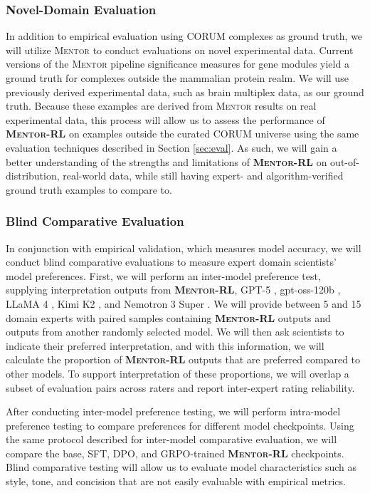 \documentclass[thesis,letterpaper,12pt]{utthesis}
\begin{document}
\subsubsection{Novel-Domain Evaluation}
In addition to empirical evaluation using CORUM complexes as ground truth, we will utilize \textsc{Mentor} to conduct evaluations on novel experimental data. Current versions of the \textsc{Mentor} pipeline significance measures for gene modules yield a ground truth for complexes outside the mammalian protein realm. We will use previously derived experimental data, such as brain multiplex data, as our ground truth. Because these examples are derived from \textsc{Mentor} results on real experimental data, this process will allow us to assess the performance of \textbf{\textsc{Mentor-RL}} on examples outside the curated CORUM universe using the same evaluation techniques described in Section \ref{sec:eval}. As such, we will gain a better understanding of the strengths and limitations of \textbf{\textsc{Mentor-RL}} on out-of-distribution, real-world data, while still having expert- and algorithm-verified ground truth examples to compare to.

\subsubsection{Blind Comparative Evaluation}\label{sec:blind-eval}
In conjunction with empirical validation, which measures model accuracy, we will conduct blind comparative evaluations to measure expert domain scientists' model preferences. First, we will perform an inter-model preference test, supplying interpretation outputs from \textbf{\textsc{Mentor-RL}}, GPT-5 \cite{gpt5}, gpt-oss-120b \cite{gpt-oss}, LLaMA 4 \cite{llama4}, Kimi K2 \cite{kimik2}, and Nemotron 3 Super \cite{nemotron3}. We will provide between 5 and 15 domain experts with paired samples containing \textbf{\textsc{Mentor-RL}} outputs and outputs from another randomly selected model. We will then ask scientists to indicate their preferred interpretation, and with this information, we will calculate the proportion of \textbf{\textsc{Mentor-RL}} outputs that are preferred compared to other models. To support interpretation of these proportions, we will overlap a subset of evaluation pairs across raters and report inter-expert rating reliability.

After conducting inter-model preference testing, we will perform intra-model preference testing to compare preferences for different model checkpoints. Using the same protocol described for inter-model comparative evaluation, we will compare the base, SFT, DPO, and GRPO-trained \textbf{\textsc{Mentor-RL}} checkpoints. Blind comparative testing will allow us to evaluate model characteristics such as style, tone, and concision that are not easily evaluable with empirical metrics.
\end{document}
